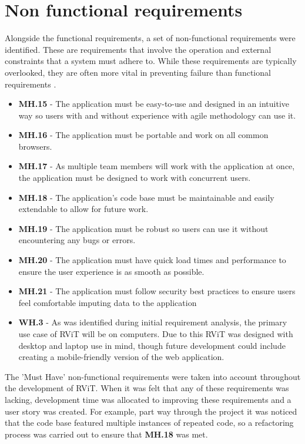 \documentclass[l4proj.tex]{subfiles}
\begin{document}
\section{Non functional requirements}
Alongside the functional requirements, a set of non-functional requirements were identified. These are requirements that involve the operation and external constraints that a system must adhere to. While these requirements are typically overlooked, they are often more vital in preventing failure than functional requirements \cite{Mairiza2010}.

\begin{itemize}
    \item \textbf{MH.15} - The application must be easy-to-use and designed in an intuitive way so users with and without experience with agile methodology can use it. 
    \item \textbf{MH.16} - The application must be portable and work on all common browsers.
    \item \textbf{MH.17} - As multiple team members will work with the application at once, the application must be designed to work with concurrent users.
    \item \textbf{MH.18} - The application's code base must be maintainable and easily extendable to allow for future work.
    \item \textbf{MH.19} - The application must be robust so users can use it without encountering any bugs or errors.
    \item \textbf{MH.20} - The application must have quick load times and performance to ensure the user experience is as smooth as possible. 
    \item \textbf{MH.21} - The application must follow security best practices to ensure users feel comfortable imputing data to the application\\

    \item \textbf{WH.3} - As was identified during initial requirement analysis, the primary use case of RViT will be on computers. Due to this RViT was designed with desktop and laptop use in mind, though future development could include creating a mobile-friendly version of the web application.
\end{itemize}

The 'Must Have' non-functional requirements were taken into account throughout the development of RViT. When it was felt that any of these requirements was lacking, development time was allocated to improving these requirements and a user story was created. For example, part way through the project it was noticed that the code base featured multiple instances of repeated code, so a refactoring process was carried out to ensure that \textbf{MH.18} was met.
\end{document}
